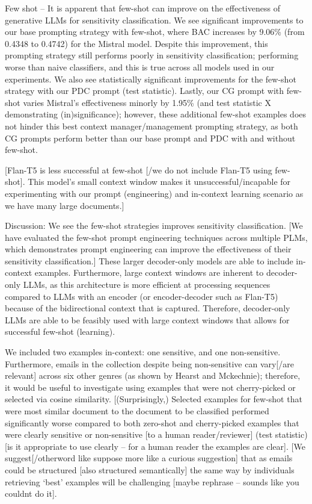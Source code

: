 Few shot – It is apparent that few-shot can improve on the effectiveness of generative LLMs for sensitivity classification. We see significant improvements to our base prompting strategy with few-shot, where BAC increases by 9.06\% (from 0.4348 to 0.4742) for the Mistral model. Despite this improvement, this prompting strategy still performs poorly in sensitivity classification; performing worse than naive classifiers, and this is true across all models used in our experiments. We also see statistically significant improvements for the few-shot strategy with our PDC prompt (test statistic). Lastly, our CG prompt with few-shot varies Mistral’s effectiveness minorly by 1.95\% (and test statistic X demonstrating (in)significance); however, these additional few-shot examples does not hinder this best context manager/management prompting strategy, as both CG prompts perform better than our base prompt and PDC with and without few-shot.

[Flan-T5 is less successful at few-shot [/we do not include Flan-T5 using few-shot]. This model’s small context window makes it unsuccessful/incapable for experimenting with our prompt (engineering) and in-context learning scenario as we have many large documents.]

Discussion: We see the few-shot strategies improves sensitivity classification. [We have evaluated the few-shot prompt engineering techniques across multiple PLMs, which demonstrates prompt engineering can improve the effectiveness of their sensitivity classification.] These larger decoder-only models are able to include in-context examples. Furthermore, large context windows are inherent to decoder-only LLMs, as this architecture is more efficient at processing sequences compared to LLMs with an encoder (or encoder-decoder such as Flan-T5) because of the bidirectional context that is captured. Therefore, decoder-only LLMs are able to be feasibly used with large context windows that allows for successful few-shot (learning).

We included two examples in-context: one sensitive, and one non-sensitive. Furthermore, emails in the collection despite being non-sensitive can vary[/are relevant] across six other genres (as shown by Hearst and Mckechnie); therefore, it would be useful to investigate using examples that were not cherry-picked or selected via cosine similarity. [(Surprisingly,) Selected examples for few-shot that were most similar document to the document to be classified performed significantly worse compared to both zero-shot and cherry-picked examples that were clearly sensitive or non-sensitive [to a human reader/reviewer] (test statistic) [is it appropriate to use clearly – for a human reader the examples are clear]. [We suggest[/otherword like suppose more like a curious suggestion] that as emails could be structured [also structured semantically] the same way by individuals retrieving ‘best’ examples will be challenging [maybe rephrase – sounds like you couldnt do it].

